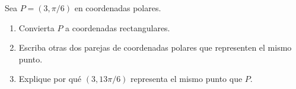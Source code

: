 Sea $P=(3,\pi/6)$ en coordenadas polares.
\begin{enumerate}
    \item Convierta $P$ a coordenadas rectangulares.
    \item Escriba otras dos parejas de coordenadas polares que representen el mismo punto.
    \item Explique por qué $(3,13\pi/6)$ representa el mismo punto que $P$.
\end{enumerate}
